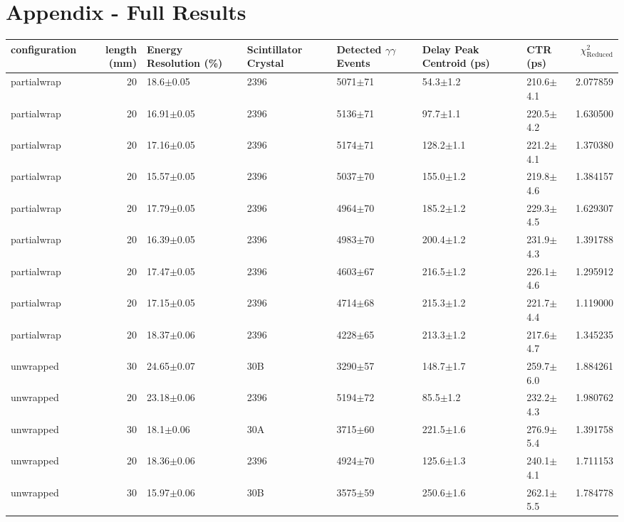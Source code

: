 \section*{Appendix - Full Results}
\begin{tabular}{lrlllllr}
\hline
configuration &  length (mm) & Energy Resolution (\%) & Scintillator Crystal & Detected $\gamma\gamma$ Events & Delay Peak Centroid (ps) & CTR (ps) &  $\chi^2_\text{Reduced}$ \\
\hline
  partialwrap &      20 &    18.6$\pm$0.05 &    2396 &  5071$\pm$71 &    54.3$\pm$1.2 &   210.6$\pm$4.1 &    2.077859 \\
  partialwrap &      20 &   16.91$\pm$0.05 &    2396 &  5136$\pm$71 &    97.7$\pm$1.1 &   220.5$\pm$4.2 &    1.630500 \\
  partialwrap &      20 &   17.16$\pm$0.05 &    2396 &  5174$\pm$71 &   128.2$\pm$1.1 &   221.2$\pm$4.1 &    1.370380 \\
  partialwrap &      20 &   15.57$\pm$0.05 &    2396 &  5037$\pm$70 &   155.0$\pm$1.2 &   219.8$\pm$4.6 &    1.384157 \\
  partialwrap &      20 &   17.79$\pm$0.05 &    2396 &  4964$\pm$70 &   185.2$\pm$1.2 &   229.3$\pm$4.5 &    1.629307 \\
  partialwrap &      20 &   16.39$\pm$0.05 &    2396 &  4983$\pm$70 &   200.4$\pm$1.2 &   231.9$\pm$4.3 &    1.391788 \\
  partialwrap &      20 &   17.47$\pm$0.05 &    2396 &  4603$\pm$67 &   216.5$\pm$1.2 &   226.1$\pm$4.6 &    1.295912 \\
  partialwrap &      20 &   17.15$\pm$0.05 &    2396 &  4714$\pm$68 &   215.3$\pm$1.2 &   221.7$\pm$4.4 &    1.119000 \\
  partialwrap &      20 &   18.37$\pm$0.06 &    2396 &  4228$\pm$65 &   213.3$\pm$1.2 &   217.6$\pm$4.7 &    1.345235 \\
    unwrapped &      30 &   24.65$\pm$0.07 &     30B &  3290$\pm$57 &   148.7$\pm$1.7 &   259.7$\pm$6.0 &    1.884261 \\
    unwrapped &      20 &   23.18$\pm$0.06 &    2396 &  5194$\pm$72 &    85.5$\pm$1.2 &   232.2$\pm$4.3 &    1.980762 \\
    unwrapped &      30 &    18.1$\pm$0.06 &     30A &  3715$\pm$60 &   221.5$\pm$1.6 &   276.9$\pm$5.4 &    1.391758 \\
    unwrapped &      20 &   18.36$\pm$0.06 &    2396 &  4924$\pm$70 &   125.6$\pm$1.3 &   240.1$\pm$4.1 &    1.711153 \\
    unwrapped &      30 &   15.97$\pm$0.06 &     30B &  3575$\pm$59 &   250.6$\pm$1.6 &   262.1$\pm$5.5 &    1.784778 \\

\end{tabular}

